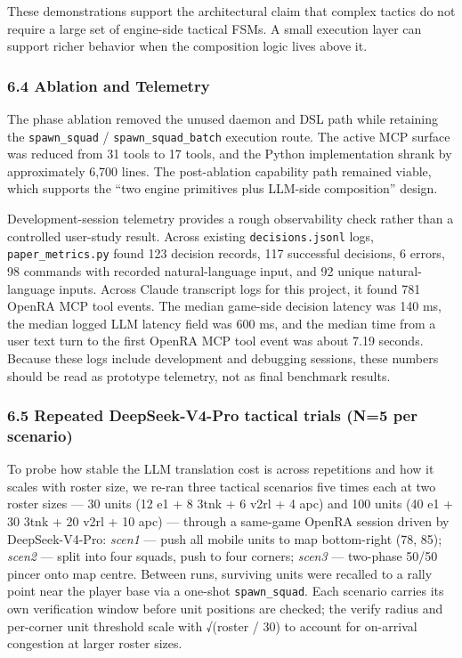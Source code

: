 \documentclass[
  journal]{IEEEtran}
\begin{document}
These demonstrations support the architectural claim that complex
tactics do not require a large set of engine-side tactical FSMs. A small
execution layer can support richer behavior when the composition logic
lives above it.

\subsubsection{6.4 Ablation and Telemetry}\label{ablation-and-telemetry}

The phase ablation removed the unused daemon and DSL path while
retaining the \texttt{spawn\_squad} / \texttt{spawn\_squad\_batch}
execution route. The active MCP surface was reduced from 31 tools to 17
tools, and the Python implementation shrank by approximately 6,700
lines. The post-ablation capability path remained viable, which supports
the ``two engine primitives plus LLM-side composition'' design.

Development-session telemetry provides a rough observability check
rather than a controlled user-study result. Across existing
\texttt{decisions.jsonl} logs, \texttt{paper\_metrics.py} found 123
decision records, 117 successful decisions, 6 errors, 98 commands with
recorded natural-language input, and 92 unique natural-language inputs.
Across Claude transcript logs for this project, it found 781 OpenRA MCP
tool events. The median game-side decision latency was 140 ms, the
median logged LLM latency field was 600 ms, and the median time from a
user text turn to the first OpenRA MCP tool event was about 7.19
seconds. Because these logs include development and debugging sessions,
these numbers should be read as prototype telemetry, not as final
benchmark results.

\subsubsection{6.5 Repeated DeepSeek-V4-Pro tactical trials (N=5 per
scenario)}\label{repeated-deepseek-v4-pro-tactical-trials-n5-per-scenario}

To probe how stable the LLM translation cost is across repetitions and
how it scales with roster size, we re-ran three tactical scenarios five
times each at two roster sizes --- 30 units (12 e1 + 8 3tnk + 6 v2rl + 4
apc) and 100 units (40 e1 + 30 3tnk + 20 v2rl + 10 apc) --- through a
same-game OpenRA session driven by DeepSeek-V4-Pro: \emph{scen1} ---
push all mobile units to map bottom-right (78, 85); \emph{scen2} ---
split into four squads, push to four corners; \emph{scen3} --- two-phase
50/50 pincer onto map centre. Between runs, surviving units were
recalled to a rally point near the player base via a one-shot
\texttt{spawn\_squad}. Each scenario carries its own verification window
before unit positions are checked; the verify radius and per-corner unit
threshold scale with √(roster / 30) to account for on-arrival congestion
at larger roster sizes.
\end{document}
